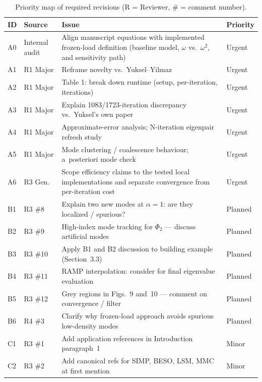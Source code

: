 \documentclass[12pt,a4paper]{article}
\newcommand{\planned}[1]{{\color{mplanned}#1}}
\newcommand{\urgent}[1]{{\color{murgent}#1}}
\newcommand{\minor}[1]{{\color{mminor}#1}}
\begin{document}
\begin{table}[htbp]
\centering
\caption{Priority map of required revisions (R = Reviewer, \# = comment number).}
\label{tab:priority}
\renewcommand\arraystretch{1.15}
\begin{tabularx}{\textwidth}{@{}p{0.7cm}p{1.6cm}p{8.5cm}p{2.5cm}@{}}
\toprule
ID & Source & Issue & Priority \\
\midrule
A0 & Internal audit & Align manuscript equations with implemented frozen-load definition
(baseline model, $\omega$ vs.\ $\omega^2$, and sensitivity path) & \urgent{Urgent} \\
A1 & R1 Major & Reframe novelty vs.\ Yuksel--Yilmaz & \urgent{Urgent} \\
A2 & R1 Major & Table 1: break down runtime (setup, per-iteration, iterations) & \urgent{Urgent} \\
A3 & R1 Major & Explain 1083/1723-iteration discrepancy vs.\ Yuksel's own paper & \urgent{Urgent} \\
A4 & R1 Major & Approximate-error analysis; N-iteration eigenpair refresh study & \urgent{Urgent} \\
A5 & R1 Major & Mode clustering / coalescence behaviour; a~posteriori mode check & \urgent{Urgent} \\
A6 & R3 Gen.  & Scope efficiency claims to the tested local implementations and separate convergence from per-iteration cost & \urgent{Urgent} \\
\midrule
B1 & R3 \#8  & Explain two new modes at $\alpha=1$: are they localized / spurious? & \planned{Planned} \\
B2 & R3 \#9  & High-index mode tracking for $\Phi_2$ — discuss artificial modes & \planned{Planned} \\
B3 & R3 \#10 & Apply B1 and B2 discussion to building example (Section~3.3) & \planned{Planned} \\
B4 & R3 \#11 & RAMP interpolation: consider for final eigenvalue evaluation & \planned{Planned} \\
B5 & R3 \#12 & Grey regions in Figs.~9 and~10 — comment on convergence / filter & \planned{Planned} \\
B6 & R4 \#3  & Clarify why frozen-load approach avoids spurious low-density modes & \planned{Planned} \\
\midrule
C1 & R3 \#1  & Add application references in Introduction paragraph~1 & \minor{Minor} \\
C2 & R3 \#2  & Add canonical refs for SIMP, BESO, LSM, MMC at first mention & \minor{Minor} \\

\end{tabularx}
\end{table}
\end{document}

